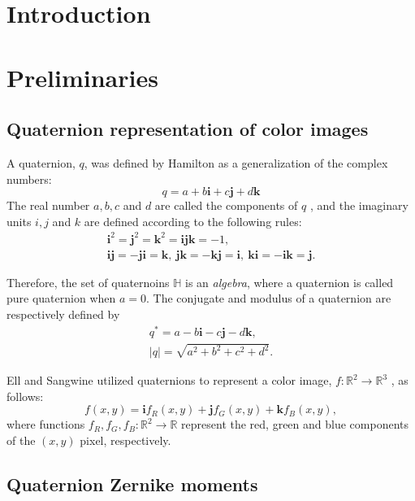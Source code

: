 \documentclass[12pt]{article}
\newcommand{\R}{\mathbb{R}}
\newcommand{\Hq}{\mathbb{H}}
\newcommand{\qi}{\textbf{i}}
\newcommand{\qj}{\textbf{j}}
\newcommand{\qk}{\textbf{k}}
\begin{document}
\section{Introduction}



\section{Preliminaries}

\subsection{Quaternion representation of color images}

A quaternion, $q$, was defined by Hamilton \cite{Hamilton} as a generalization of the complex numbers: 
\[
	q = a+b\qi +c\qj+d\qk
\]
The real number $a , b , c$ and $d$ are called the components of $q$ , and the imaginary units $i , j$ and $k$ are defined according to the following rules:
\[
\begin{gathered}
	\qi^2 = \qj^2 = \qk^2 = \qi\qj\qk = -1,\\
	\qi\qj = -\qj\qi = \qk,\ \qj\qk = -\qk\qj = \qi,\ \qk\qi = -\qi\qk = \qj.
\end{gathered}
\]

Therefore, the set of quaternoins $\Hq$ is an \textit{algebra}, where a quaternion is called pure quaternion when $a=0$. 
The conjugate and modulus of a quaternion are respectively defined by 
\[
\begin{gathered}
q^* = a-b\qi-c\qj-d\qk, \\
|q| = \sqrt{a^2+b^2+c^2+d^2}.
\end{gathered}
\]

Ell and Sangwine \cite{EllSangwine} utilized quaternions to represent a color image, $f: \R^2\to\R^3$ , as follows:
\[
f(x,y) = \qi f_R(x,y) + \qj f_G(x,y) + \qk f_B(x,y),
\]
where functions $f_R , f_G, f_B:\R^2\to\R$ represent the red, green and blue components of the $(x,y)$ pixel, respectively.

\subsection{Quaternion Zernike moments}
\end{document}
